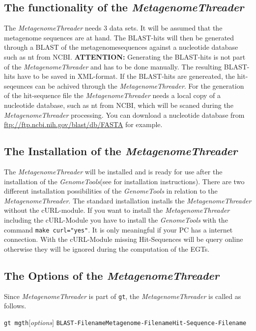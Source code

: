 \documentclass[12pt,titlepage]{article}
\newcommand{\MetagenomeThreader}{\textit{MetagenomeThreader}\xspace}
\newcommand{\GenomeTools}{\textit{GenomeTools}\xspace}
\newcommand{\XMLFile}{\texttt{\small{BLAST-Filename}}\xspace}
\newcommand{\MGFile}{\texttt{\small{Metagenome-Filename}}\xspace}
\newcommand{\HitFile}{\texttt{\small{Hit-Sequence-Filename}}\xspace}
\newcommand{\Gtmgth}{\texttt{gt mgth}\xspace}
\newcommand{\Gt}{\texttt{gt}\xspace}
\newcommand{\Attention}{\textbf{ATTENTION:}\xspace}
\begin{document}
\subsection{The functionality of the \MetagenomeThreader} \label{Functional}

The \MetagenomeThreader needs 3 data sets. It will be assumed that the metagenome
sequences are at hand. The BLAST-hits will then be generated through a BLAST of 
the metagenomesequences against a nucleotide database such as nt from NCBI.
\Attention Generating the BLAST-hits is not part of the \MetagenomeThreader and
has to be done manually. The resulting BLAST-hits have to be saved in XML-format.
If the BLAST-hits are genereated, the hit-seqeunces can be achived through the
\MetagenomeThreader. For the generation of the hit-sequence file the \MetagenomeThreader
needs a local copy of a nucleotide database, such as nt from NCBI, which will be scaned
during the \MetagenomeThreader processing. You can download a nucleotide database
from
\\
{\url{ftp://ftp.ncbi.nih.gov/blast/db/FASTA}} for example.

\subsection{The Installation of the \MetagenomeThreader} \label{Install}

The \MetagenomeThreader will be installed and is ready for use after the
installation of the \GenomeTools (see \cite{genometools} for installation instructions).
There are two different installation possibilities of the \GenomeTools in relation to the \MetagenomeThreader.
The standard installation installs the \MetagenomeThreader without the cURL-module.
If you want to install the \MetagenomeThreader including the cURL-Module you have to install the
\GenomeTools with the command \texttt{make curl="yes"}. It is only meaningful if your PC has a internet connection.
With the cURL-Module missing Hit-Sequences will be query online otherwise they
will be ignored during the computation of the EGTs.

\subsection{The Options of the \MetagenomeThreader} \label{Overview}

Since \MetagenomeThreader is part of \Gt, the \MetagenomeThreader is called as follows.

\Gtmgth $[$\emph{options}$]$ \XMLFile \MGFile \HitFile
\end{document}
